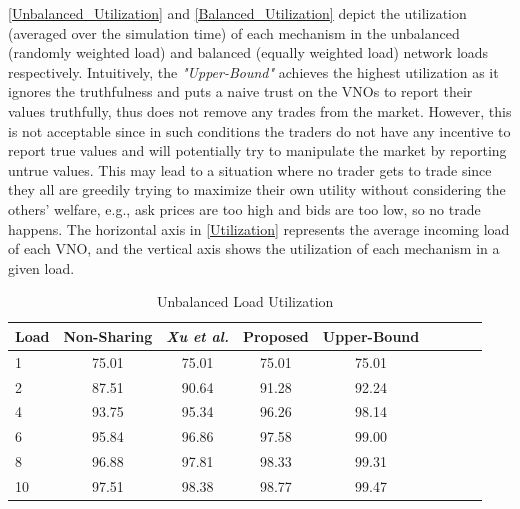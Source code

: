 \autoref{Unbalanced_Utilization} and \autoref{Balanced_Utilization} depict the utilization (averaged over the simulation time) of each mechanism in the unbalanced (randomly weighted load) and balanced (equally weighted load) network loads respectively. Intuitively, the \textit{"Upper-Bound"} achieves the highest utilization as it ignores the truthfulness and puts a naive trust on the \acp{VNO} to report their values truthfully, thus does not remove any trades from the market. However, this is not acceptable since in such conditions the traders do not have any incentive to report true values and will potentially try to manipulate the market by reporting untrue values. This may lead to a situation where no trader gets to trade since they all are greedily trying to maximize their own utility without considering the others' welfare, e.g., ask prices are too high and bids are too low, so no trade happens. The horizontal axis in \autoref{Utilization} represents the average incoming load of each \ac{VNO}, and the vertical axis shows the utilization of each mechanism in a given load.

\begin{table}%
   \caption{Unbalanced Load Utilization}
   \label{tab:util:unbal}
   \small %
   \centering %
   \begin{tabular}{lcccccccr} %
   \toprule[\heavyrulewidth]\toprule[\heavyrulewidth]
       Load & Non-Sharing    & \textit{Xu et al.} & Proposed    & Upper-Bound \\ \hline
   \midrule
    1  & 75.01  & 75.01 & 75.01 & 75.01\\
    2  & 87.51  & 90.64 & 91.28 & 92.24\\
    4  & 93.75  & 95.34 & 96.26 & 98.14\\
    6  & 95.84  & 96.86 & 97.58 & 99.00\\
    8  & 96.88  & 97.81 & 98.33 & 99.31\\
    10 & 97.51  & 98.38 & 98.77 & 99.47\\
   \bottomrule[\heavyrulewidth]
   \end{tabular}
\end{table}

